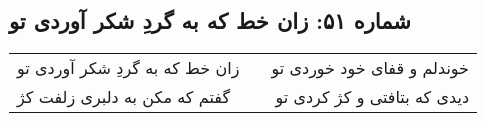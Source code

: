 \begin{center}
\section*{شماره ۵۱: زان خط که به گردِ شکر آوردی تو}
\label{sec:051}
\begin{longtable}{l p{0.5cm} r}
زان خط که به گردِ شکر آوردی تو
&&
خوندلم و قفای خود خوردی تو
\\
گفتم که مکن به دلبری زلفت کژ
&&
دیدی که بتافتی و کژ کردی تو
\\
\end{longtable}
\end{center}
